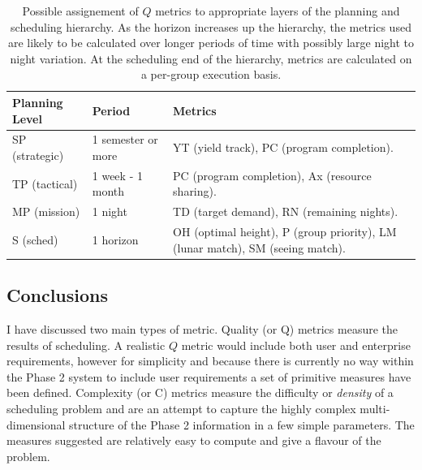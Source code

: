 \begin{table}[htbp]
 \begin{center}
  \begin{tabular} {|l|l|p{7cm}|}
    \hline
    Planning Level &  Period              &      Metrics\\
    \hline
    SP (strategic) &  1 semester or more  & YT (yield track), PC (program completion).\\
    \hline
    TP (tactical)  &  1 week - 1 month    & PC (program completion), Ax (resource sharing).\\
    \hline
    MP (mission)   &  1 night             & TD (target demand), RN (remaining nights).\\
    \hline
    S (sched)      &  1 horizon           & OH (optimal height), P (group priority), LM (lunar match), SM (seeing match).\\
    \hline
  \end{tabular}
  \label{tab:planning_metrics}
  \caption[Assignment of $Q$ metrics to hierarchic planning levels.]{Possible assignement of $Q$ metrics to appropriate layers of the planning and scheduling hierarchy. As the horizon increases up the hierarchy, the metrics used are likely to be calculated over longer periods of time with possibly large night to night variation. At the scheduling end of the hierarchy, metrics are calculated on a per-group execution basis.}
 \end{center}
\end{table}

\subsection{Conclusions}
I have discussed two main types of metric. Quality (or Q) metrics measure the results of scheduling. A realistic $Q$ metric would include both user and enterprise requirements, however for simplicity and because there is currently no way within the Phase 2 system to include user requirements a set of primitive measures have been defined. Complexity (or C) metrics measure the difficulty or \emph{density} of a scheduling problem and are an attempt to capture the highly complex multi-dimensional structure of the Phase 2 information in a few simple parameters. The measures suggested are relatively easy to compute and give a flavour of the problem.




